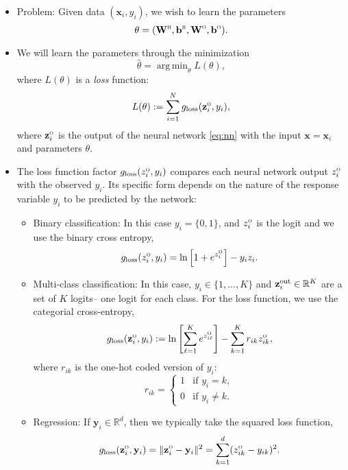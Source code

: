 \documentclass[11pt]{article}
\def\beq{\begin{equation}}
\def\eeq{\end{equation}}
\def\R{{\mathbb{R}}}
\def\argmin{\mathop{\mathrm{arg\,min}}}
\newcommand{\bbf}{\mathbf{b}}
\newcommand{\xbf}{\mathbf{x}}
\newcommand{\ybf}{\mathbf{y}}
\newcommand{\zbf}{\mathbf{z}}
\newcommand{\Wbf}{\mathbf{W}}
\def\hid{\textsc{\tiny H}}
\def\out{\textsc{\tiny O}}
\begin{document}
\begin{itemize}
\item Problem:  Given data $(\xbf_i,y_i)$, we wish to learn the parameters
\beq \label{eq:thetann}
    \theta = (\Wbf^\hid,\bbf^\hid,\Wbf^\out,\bbf^\out).
\eeq
\item We will learn the parameters through the minimization
\beq \label{eq:thetamin}
    \hat{\theta} = \argmin_{\theta} L(\theta),
\eeq
where $L(\theta)$ is a \emph{loss} function:
\beq \label{eq:Ltheta}
    L(\theta) := \sum_{i=1}^N g_{\rm loss}(\zbf_i^\out,y_i),
\eeq
where $\zbf_i^\out$ is the output of the neural network \eqref{eq:nn} with the input
$\xbf=\xbf_i$ and parameters $\theta$.

\item The loss function factor $g_{\rm loss}(z^\out_i,y_i)$ compares each
neural network output $z^\out_i$ with the observed $y_i$.  Its specific form
depends on the nature of the response variable $y_i$ to be predicted by the network:
\begin{itemize}
\item Binary classification:  In this case $y_i=\{0,1\}$,
and $z^\out_i$ is the logit and we use the binary cross entropy,
\beq \label{eq:gloss_bin}
    g_{\rm loss}(z^\out_i,y_i) = \ln\left[ 1 + e^{z_i^\out} \right] -y_iz_i.
\eeq

\item Multi-class classification:  In this case, $y_i \in \{1,\ldots,K\}$
and $\zbf_i^{\rm out} \in \R^K$ are a set of $K$ logits-- one logit for each class.
For the loss function, we use the categorial cross-entropy,
\beq \label{eq:gloss_mc}
    g_{\rm loss}(\zbf^\out_i,y_i) :=
    \ln\left[ \sum_{\ell=1}^K e^{z^\out_{i\ell}} \right] -
        \sum_{k=1}^K r_{ik}z^\out_{ik},
\eeq
where $r_{ik}$ is the one-hot coded version of $y_i$:
\beq \label{eq:rik}
    r_{ik} = \begin{cases}
        1 & \mbox{if } y_i = k, \\
        0 & \mbox{if } y_i \neq k.
        \end{cases}
\eeq

\item Regression:  If $\ybf_i \in \R^d$, then we typically take the squared loss function,
\beq \label{eq:gloss_square}
    g_{\rm loss}(\zbf^\out_i,\ybf_i) = \|\zbf^\out_i-\ybf_i\|^2
        = \sum_{k=1}^d (z^\out_{ik} - y_{ik})^2.
\eeq
\end{itemize}


\end{itemize}
\end{document}
